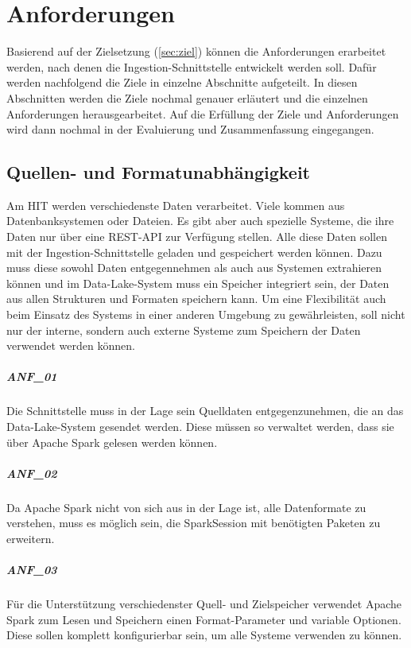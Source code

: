 \chapter{Anforderungen}
\label{sec:anf}

Basierend auf der Zielsetzung (\cref{sec:ziel}) können die Anforderungen erarbeitet werden, nach denen die Ingestion-Schnittstelle entwickelt werden soll.
Dafür werden nachfolgend die Ziele in einzelne Abschnitte aufgeteilt.
In diesen Abschnitten werden die Ziele nochmal genauer erläutert und die einzelnen Anforderungen herausgearbeitet.
Auf die Erfüllung der Ziele und Anforderungen wird dann nochmal in der Evaluierung und Zusammenfassung eingegangen.

\section{Quellen- und Formatunabhängigkeit}
\label{sec:anf-unab}
Am HIT werden verschiedenste Daten verarbeitet.
Viele kommen aus Datenbanksystemen oder Dateien.
Es gibt aber auch spezielle Systeme, die ihre Daten nur über eine REST-API zur Verfügung stellen.
Alle diese Daten sollen mit der Ingestion-Schnittstelle geladen und gespeichert werden können.
Dazu muss diese sowohl Daten entgegennehmen als auch aus Systemen extrahieren können und im Data-Lake-System muss ein Speicher integriert sein, der Daten aus allen Strukturen und Formaten speichern kann.
Um eine Flexibilität auch beim Einsatz des Systems in einer anderen Umgebung zu gewährleisten, soll nicht nur der interne, sondern auch externe Systeme zum Speichern der Daten verwendet werden können.

\paragraph{ANF\_01}
\label{ANF_01}
Die Schnittstelle muss in der Lage sein Quelldaten entgegenzunehmen, die an das Data-Lake-System gesendet werden.
Diese müssen so verwaltet werden, dass sie über Apache Spark gelesen werden können.

\paragraph{ANF\_02}
\label{ANF_02}
Da Apache Spark nicht von sich aus in der Lage ist, alle Datenformate zu verstehen, muss es möglich sein, die SparkSession mit benötigten Paketen zu erweitern.

\paragraph{ANF\_03}
\label{ANF_03}
Für die Unterstützung verschiedenster Quell- und Zielspeicher verwendet Apache Spark zum Lesen und Speichern einen Format-Parameter und variable Optionen.
Diese sollen komplett konfigurierbar sein, um alle Systeme verwenden zu können.

